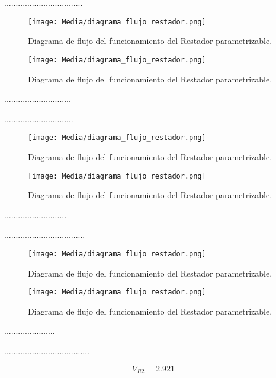 \documentclass[journal]{IEEEtran}
\begin{document}
\par ..................................
\begin{figure}[H]
    \centering
    \texttt{[image: Media/diagrama\_flujo\_restador.png]}
    \caption{Diagrama de flujo del funcionamiento del Restador parametrizable.}
    \label{fig:diagrama_flujo_restador}
\end{figure}
\begin{figure}[H]
    \centering
    \texttt{[image: Media/diagrama\_flujo\_restador.png]}
    \caption{Diagrama de flujo del funcionamiento del Restador parametrizable.}
    \label{fig:diagrama_flujo_restador}
\end{figure}

\par .............................
\par .............................. 
\begin{figure}[H]
    \centering
    \texttt{[image: Media/diagrama\_flujo\_restador.png]}
    \caption{Diagrama de flujo del funcionamiento del Restador parametrizable.}
    \label{fig:diagrama_flujo_restador}
\end{figure}
\begin{figure}[H]
    \centering
    \texttt{[image: Media/diagrama\_flujo\_restador.png]}
    \caption{Diagrama de flujo del funcionamiento del Restador parametrizable.}
    \label{fig:diagrama_flujo_restador}
\end{figure}

\par ...........................
\par ...................................
\begin{figure}[H]
    \centering
    \texttt{[image: Media/diagrama\_flujo\_restador.png]}
    \caption{Diagrama de flujo del funcionamiento del Restador parametrizable.}
    \label{fig:diagrama_flujo_restador}
\end{figure}
\begin{figure}[H]
    \centering
    \texttt{[image: Media/diagrama\_flujo\_restador.png]}
    \caption{Diagrama de flujo del funcionamiento del Restador parametrizable.}
    \label{fig:diagrama_flujo_restador}
\end{figure}
\par ......................
\par .....................................

\begin{equation*}
    V_{R2}=2.921
\end{equation*}
\end{document}
